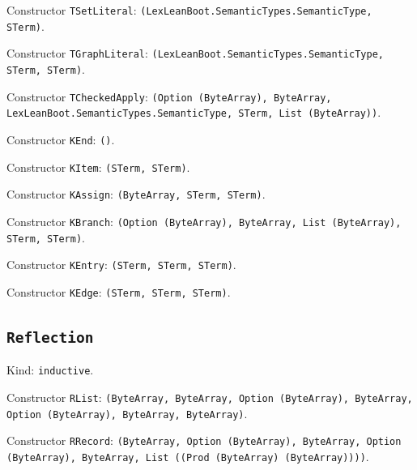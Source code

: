 \documentclass[11pt]{article}
\begin{document}
\noindent Constructor \texttt{TSetLiteral}: \texttt{(LexLeanBoot.SemanticTypes.SemanticType, STerm)}.\par
\noindent Constructor \texttt{TGraphLiteral}: \texttt{(LexLeanBoot.SemanticTypes.SemanticType, STerm, STerm)}.\par
\noindent Constructor \texttt{TCheckedApply}: \texttt{(Option (ByteArray), ByteArray, LexLeanBoot.SemanticTypes.SemanticType, STerm, List (ByteArray))}.\par
\noindent Constructor \texttt{KEnd}: \texttt{()}.\par
\noindent Constructor \texttt{KItem}: \texttt{(STerm, STerm)}.\par
\noindent Constructor \texttt{KAssign}: \texttt{(ByteArray, STerm, STerm)}.\par
\noindent Constructor \texttt{KBranch}: \texttt{(Option (ByteArray), ByteArray, List (ByteArray), STerm, STerm)}.\par
\noindent Constructor \texttt{KEntry}: \texttt{(STerm, STerm, STerm)}.\par
\noindent Constructor \texttt{KEdge}: \texttt{(STerm, STerm, STerm)}.\par
\subsection*{\texttt{Reflection}}
\noindent Kind: \texttt{inductive}.\par
\noindent Constructor \texttt{RList}: \texttt{(ByteArray, ByteArray, Option (ByteArray), ByteArray, Option (ByteArray), ByteArray, ByteArray)}.\par
\noindent Constructor \texttt{RRecord}: \texttt{(ByteArray, Option (ByteArray), ByteArray, Option (ByteArray), ByteArray, List ((Prod (ByteArray) (ByteArray))))}.\par
\end{document}
